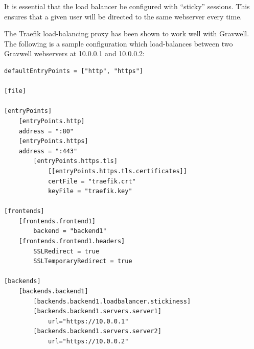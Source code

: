 It is essential that the load balancer be configured with ``sticky''
sessions. This ensures that a given user will be directed to the same
webserver every time.

The Traefik load-balancing proxy has been shown to work well with
Gravwell. The following is a sample configuration which load-balances
between two Gravwell webservers at 10.0.0.1 and 10.0.0.2:

\begin{Verbatim}[breaklines=true]
defaultEntryPoints = ["http", "https"]

[file]

[entryPoints]
    [entryPoints.http]
    address = ":80"
    [entryPoints.https]
    address = ":443"
        [entryPoints.https.tls]
            [[entryPoints.https.tls.certificates]]
            certFile = "traefik.crt"
            keyFile = "traefik.key"

[frontends]
    [frontends.frontend1]
        backend = "backend1"
    [frontends.frontend1.headers]
        SSLRedirect = true
        SSLTemporaryRedirect = true

[backends]
    [backends.backend1]
        [backends.backend1.loadbalancer.stickiness]
        [backends.backend1.servers.server1]
            url="https://10.0.0.1"
        [backends.backend1.servers.server2]
            url="https://10.0.0.2"
\end{Verbatim}
